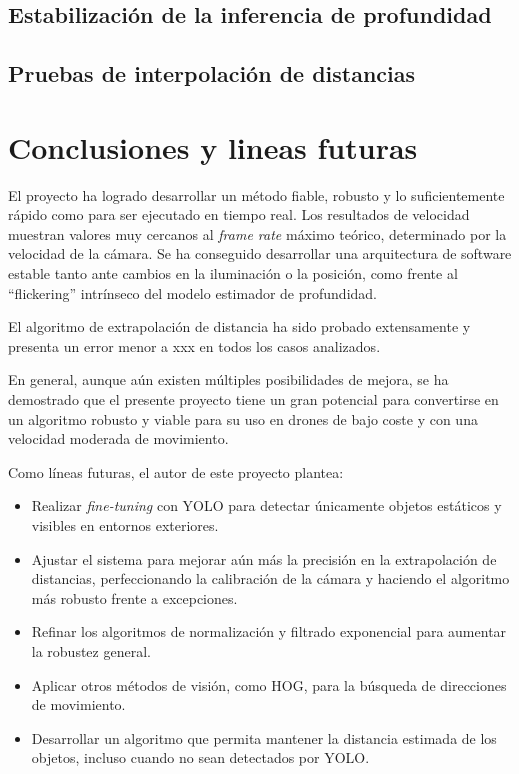     \section{Estabilización de la inferencia de profundidad}
    \section{Pruebas de interpolación de distancias}
  \chapter{Conclusiones y lineas futuras}

El proyecto ha logrado desarrollar un método fiable, robusto y lo suficientemente rápido como para ser ejecutado en tiempo real. Los resultados de velocidad muestran valores muy cercanos al \textit{frame rate} máximo teórico, determinado por la velocidad de la cámara. Se ha conseguido desarrollar una arquitectura de software estable tanto ante cambios en la iluminación o la posición, como frente al ``flickering'' intrínseco del modelo estimador de profundidad.

El algoritmo de extrapolación de distancia ha sido probado extensamente y presenta un error menor a xxx en todos los casos analizados.

En general, aunque aún existen múltiples posibilidades de mejora, se ha demostrado que el presente proyecto tiene un gran potencial para convertirse en un algoritmo robusto y viable para su uso en drones de bajo coste y con una velocidad moderada de movimiento.

Como líneas futuras, el autor de este proyecto plantea:

\begin{itemize}
\item Realizar \textit{fine-tuning} con YOLO para detectar únicamente objetos estáticos y visibles en entornos exteriores.
\item Ajustar el sistema para mejorar aún más la precisión en la extrapolación de distancias, perfeccionando la calibración de la cámara y haciendo el algoritmo más robusto frente a excepciones.
\item Refinar los algoritmos de normalización y filtrado exponencial para aumentar la robustez general.
\item Aplicar otros métodos de visión, como HOG, para la búsqueda de direcciones de movimiento.
\item Desarrollar un algoritmo que permita mantener la distancia estimada de los objetos, incluso cuando no sean detectados por YOLO.
\end{itemize}

    